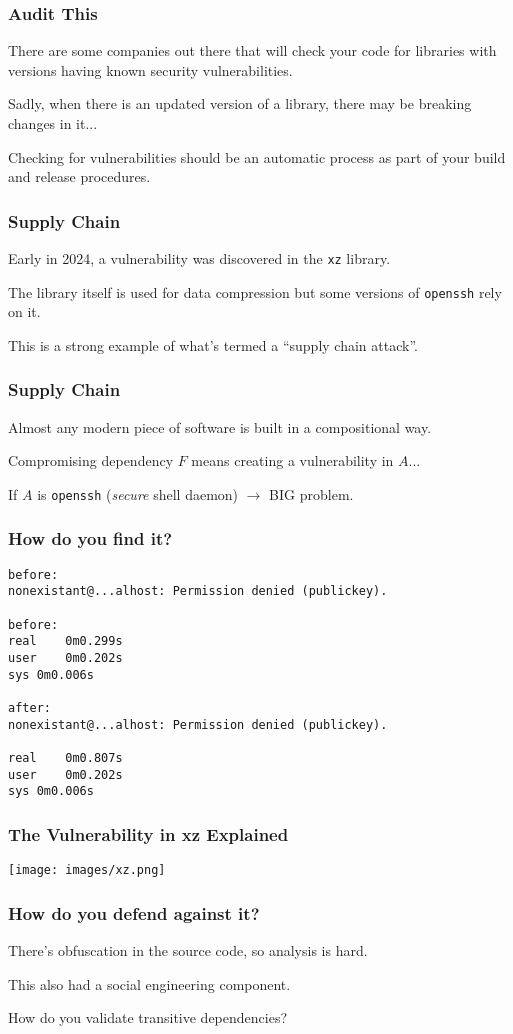\begin{frame}
\frametitle{Audit This}

There are some companies out there that will check your code for libraries with versions having known security vulnerabilities.

Sadly, when there is an updated version of a library, there may be breaking changes in it...

Checking for vulnerabilities should be an automatic process as part of your build and release procedures. 

\end{frame}

\begin{frame}
\frametitle{Supply Chain}

Early in 2024, a vulnerability was discovered in the \texttt{xz} library.

The library itself is used for data compression but some versions of \texttt{openssh} rely on it. 

This is a strong example of what's termed a ``supply chain attack''. 

\end{frame}

\begin{frame}
\frametitle{Supply Chain}

Almost any modern piece of software is built in a compositional way.

Compromising dependency $F$ means creating a vulnerability in $A$...


If $A$ is \texttt{openssh} (\textit{secure} shell daemon) $\rightarrow$ BIG problem.

\end{frame}

\begin{frame}[fragile]
\frametitle{How do you find it?}

\begin{verbatim}
before:
nonexistant@...alhost: Permission denied (publickey).

before:
real	0m0.299s
user	0m0.202s
sys	0m0.006s

after:
nonexistant@...alhost: Permission denied (publickey).

real	0m0.807s
user	0m0.202s
sys	0m0.006s
\end{verbatim}

\end{frame}

\begin{frame}
\frametitle{The Vulnerability in xz Explained}

\begin{center}
  \texttt{[image: images/xz.png]}
\end{center}

\end{frame}

\begin{frame}
\frametitle{How do you defend against it?}

There's obfuscation in the source code, so analysis is hard.

This also had a social engineering component.

How do you validate transitive dependencies?

\end{frame}





